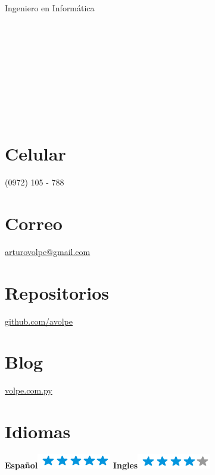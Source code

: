 \documentclass[]{friggeri-cv}
\begin{document}
{Ingeniero en Informática}


\begin{aside}
	\section{}~
    \section{}~
    \section{}~
    \section{Celular}
        (0972) 105 - 788
        ~
    \section{Correo}
        \href{mailto:arturovolpe@gmail.com}{arturovolpe@gmail.com}
        ~
    \section{Repositorios}
        \href{https://github.com/avolpe}{github.com/avolpe}
        ~
    \section{Blog}
        \href{https://www.volpe.com.py}{volpe.com.py}
        ~
\section{Idiomas}
\textbf{Español}\includegraphics[scale=0.40]{img/5stars.png}
\textbf{Ingles}\includegraphics[scale=0.40]{img/4stars.png}
\end{aside}
\end{document}
